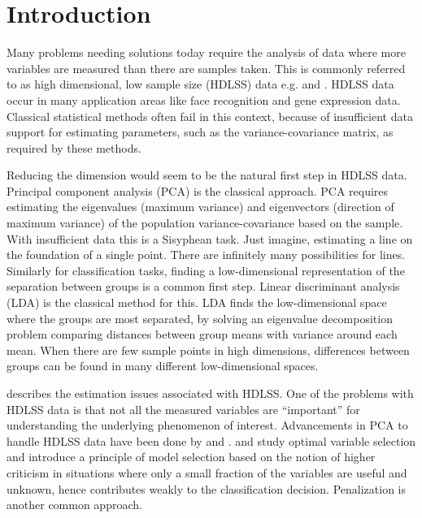 \section{Introduction} 

Many problems needing solutions today require the analysis of data where more variables are measured than there are samples taken. This is commonly referred to as high dimensional, low sample size (HDLSS) data e.g. \cite{hall:2005} and \cite{marron:2007}. %
HDLSS data occur in many application areas like face recognition and gene expression data. Classical statistical methods often fail in this context, because of insufficient data support for estimating parameters, such as the variance-covariance matrix, as required by these methods. 

Reducing the dimension would seem to be the natural first step in HDLSS data. Principal component analysis (PCA) is the classical approach. PCA requires estimating the eigenvalues (maximum variance) and eigenvectors (direction of maximum variance) of the population variance-covariance based on the sample. With insufficient data this is a Sisyphean task. Just imagine, estimating a line on the foundation of a single point. There are infinitely many possibilities for lines. Similarly for classification tasks, finding a low-dimensional representation of the separation between groups is a common first step. Linear discriminant analysis (LDA) is the classical method for this. LDA finds the low-dimensional space where the groups are most separated, by solving an eigenvalue decomposition problem comparing distances between group means with variance around each mean. When there are few sample points in high dimensions, differences between groups can be found in many different low-dimensional spaces. 

\cite{marron:2007} describes the estimation issues associated with HDLSS.  
One of the problems with HDLSS data is that not all the measured variables are ``important'' for understanding the underlying phenomenon of interest. Advancements in PCA to handle HDLSS data have been done by \cite{marron:2011} and \cite{yata:2010}. \cite{donoho:2009} and \cite{donoho:2008} study optimal variable selection and introduce a principle of model selection based on the notion of higher criticism in situations where only a small fraction of the variables are useful and unknown, hence contributes weakly to the classification decision. Penalization \citep[e.g.][]{witten:2011, lee:2009} is another common approach.

